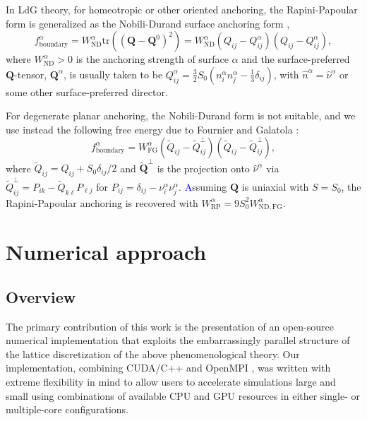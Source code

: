 \documentclass[utf8]{frontiersFPHY} %
\newcommand{\DAB}[1]{\textcolor{blue}{#1}}
\newcommand{\Q}{\mathbf{Q}}
\newcommand{\tr}{\textrm{tr}}
\begin{document}
In LdG theory, for homeotropic or other oriented anchoring, the Rapini-Papoular form is generalized as the Nobili-Durand surface anchoring form \cite{nobili1992disorientation},
\begin{equation}
f_{\mathrm{boundary}}^\alpha  = W_{\mathrm{ND}}^\alpha \tr\left( (\Q-\Q^0)^2\right) = W_{\mathrm{ND}}^\alpha (Q_{i j} - Q^\alpha_{ i j})(Q_{i j} - Q^\alpha_{ i j}),
\end{equation}
where $W_{\mathrm{ND}}^\alpha>0$ is the anchoring strength of surface $\alpha$ and  the surface-preferred $\Q$-tensor, $\Q^\alpha$, is usually taken to be  $Q^\alpha_{i j} = \frac{3}{2} S_0 (n_i^\alpha n_j^\alpha - \tfrac{1}{3} \delta_{ij})$, with $\hat n ^\alpha = \hat \nu^\alpha$ or some other surface-preferred director. 

For degenerate planar anchoring, the Nobili-Durand form is not suitable, and we use instead the following free energy due to Fournier and Galatola \cite{Fournier2005}:
\begin{equation}\label{eq:planarDegenerate}
f_{\mathrm{boundary}}^\alpha  = W_{\mathrm{FG}}^\alpha (\tilde{Q}_{ij}-\tilde{Q}^\bot_{ij})(\tilde{Q}_{ij}-\tilde{Q}^\bot_{ij}) ,%
\end{equation}
where $\tilde{Q}_{ij} = Q_{ij}+S_0\delta_{ij}/2$ and $\tilde{\Q}^\bot$ is the projection onto $\hat{\nu}^\alpha $ via $\tilde{Q}^\bot_{ij} = P_{ik} -\tilde{Q}_{k\ell} P_{\ell j}$ for $P_{ij} = \delta_{ij} -  \nu_i^\alpha \nu_j^\alpha$. \DAB{A}ssuming $\Q$ is uniaxial with $S=S_0$, the Rapini-Papoular anchoring is recovered with $W_{\mathrm{RP}}^\alpha =9  S_0^2 W_{\mathrm{ND,FG}}^\alpha$. 

\section{Numerical approach} \label{sec: NumericalApproach}
\subsection{Overview}
The primary contribution of this work is the presentation of an open-source numerical implementation that exploits the embarrassingly parallel structure of the lattice discretization of the above phenomenological theory.  Our implementation, combining CUDA/C++ \citep{nvidia2011nvidia} and OpenMPI \citep{gabriel2004open}, was written with extreme flexibility in mind to allow users to accelerate simulations large and small using combinations of available CPU and GPU resources in either single- or multiple-core configurations.
\end{document}
